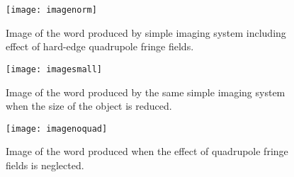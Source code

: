 \newpage
\begin{figure}[ht]
  \centering
  \texttt{[image: imagenorm]}
  \caption{Image of the word \Mary produced by
                  simple imaging system including effect of
                     hard-edge quadrupole fringe fields.}
\end{figure}

\begin{figure}[h]
  \centering
  \texttt{[image: imagesmall]}
  \caption{Image of the word \Mary produced
               by the same simple imaging system when the size
                          of the object is reduced.}
\end{figure}

\newpage
\begin{figure}[htp]
  \centering
  \texttt{[image: imagenoquad]}
  \caption{Image of the word \Mary
                  produced when the effect of quadrupole
                  fringe fields is neglected.}
\end{figure}

